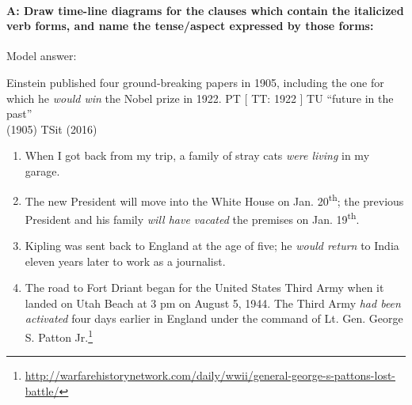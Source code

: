 \paragraph*{A: Draw time-line diagrams for the clauses which contain the italicized verb forms, and name the tense/aspect expressed by those forms:}
\textsf{Model answer:}

Einstein published four ground-breaking papers in 1905, including the one for which he \textit{would win}  the Nobel prize in 1922.
    PT  [  TT: 1922  ]  TU     “future in the past”\\
  (1905)    \textbf{{\textbar}}TSit\textbf{{\textbar}}    (2016)

\begin{enumerate}[label=\alph*.]
\item When I got back from my trip, a family of stray cats \textit{were living} in my garage.
\item The new President will move into the White House on Jan. 20\textsuperscript{th}; the previous President and his family \textit{will have vacated} the premises on Jan. 19\textsuperscript{th}.
\item Kipling was sent back to England at the age of five; he \textit{would return} to India eleven years later to work as a journalist.
\item The road to Fort Driant began for the United States Third Army when it landed on Utah Beach at 3 pm on August 5, 1944. The Third Army \textit{had been activated} four days earlier in England under the command of Lt. Gen. George S. Patton Jr.\footnote{\url{http://warfarehistorynetwork.com/daily/wwii/general-george-s-pattons-lost-battle/}} 
\end{enumerate}